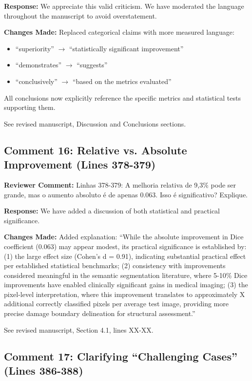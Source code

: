 \documentclass[11pt]{article}
\newcommand{\reviewercomment}[1]{\textcolor{reviewercolor}{\textbf{Reviewer Comment:} #1}}
\newcommand{\response}[1]{\textcolor{responsecolor}{\textbf{Response:} #1}}
\newcommand{\change}[1]{\textcolor{changecolor}{\textbf{Changes Made:} #1}}
\begin{document}
\response{We appreciate this valid criticism. We have moderated the language throughout the manuscript to avoid overstatement.}

\change{Replaced categorical claims with more measured language:
\begin{itemize}[nosep]
    \item ``superiority'' $\rightarrow$ ``statistically significant improvement''
    \item ``demonstrates'' $\rightarrow$ ``suggests''
    \item ``conclusively'' $\rightarrow$ ``based on the metrics evaluated''
\end{itemize}

All conclusions now explicitly reference the specific metrics and statistical tests supporting them.

See revised manuscript, Discussion and Conclusions sections.}

\subsection{Comment 16: Relative vs. Absolute Improvement (Lines 378-379)}

\reviewercomment{Linhas 378-379: A melhoria relativa de 9,3\% pode ser grande, mas o aumento absoluto é de apenas 0.063. Isso é significativo? Explique.}

\response{We have added a discussion of both statistical and practical significance.}

\change{Added explanation: ``While the absolute improvement in Dice coefficient (0.063) may appear modest, its practical significance is established by: (1) the large effect size (Cohen's d = 0.91), indicating substantial practical effect per established statistical benchmarks; (2) consistency with improvements considered meaningful in the semantic segmentation literature, where 5-10\% Dice improvements have enabled clinically significant gains in medical imaging; (3) the pixel-level interpretation, where this improvement translates to approximately X additional correctly classified pixels per average test image, providing more precise damage boundary delineation for structural assessment.''

See revised manuscript, Section 4.1, lines XX-XX.}

\subsection{Comment 17: Clarifying ``Challenging Cases'' (Lines 386-388)}
\end{document}
